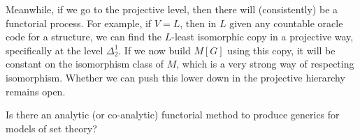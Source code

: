 \documentclass{amsart}
\begin{document}
Meanwhile, if we go to the projective level, then there will (consistently) be a functorial process. For example, if $V=L$, then in $L$ given any countable oracle code for a structure, we can find the $L$-least isomorphic copy in a projective way, specifically at the level $\Delta^1_2$. If we now build $M[G]$ using this copy, it will be constant on the isomorphism class of $M$, which is a very strong way of respecting isomorphism. Whether we can push this lower down in the projective hierarchy remains open.

\begin{question}
Is there an analytic (or co-analytic) functorial method to produce generics for models of set theory?
\end{question}



\end{document}

